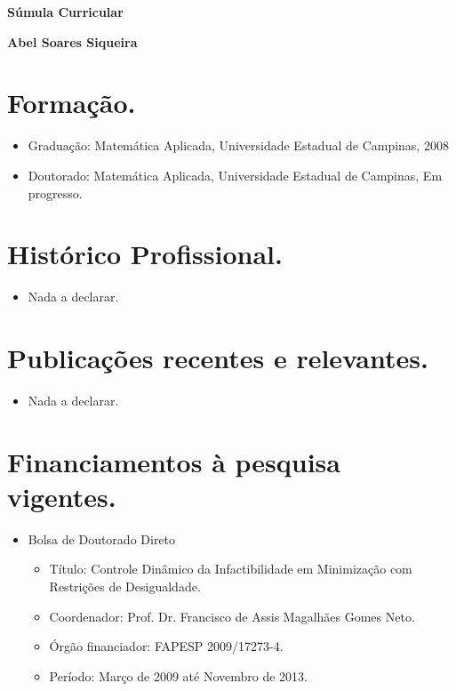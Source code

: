 \documentclass[a4paper,11pt]{article}
\begin{document}
\begin{center}
  \Large \bf Súmula Curricular
\end{center}
\begin{center}
  \bf Abel Soares Siqueira
\end{center}

\section{Formação.}
\begin{itemize}
  \item Graduação: Matemática Aplicada, Universidade Estadual de Campinas, 2008
  \item Doutorado: Matemática Aplicada, Universidade Estadual de Campinas, Em
    progresso.
\end{itemize}

\section{Histórico Profissional.}
\begin{itemize}
  \item Nada a declarar.
\end{itemize}

\section{Publicações recentes e relevantes.}
\begin{itemize}
  \item Nada a declarar.
\end{itemize}

\section{Financiamentos à pesquisa vigentes.}
\begin{itemize}
  \item Bolsa de Doutorado Direto 
  \begin{itemize}
    \item Título: Controle Dinâmico da Infactibilidade em Minimização com
      Restrições de Desigualdade.
    \item Coordenador: Prof. Dr. Francisco de Assis Magalhães Gomes Neto.
    \item Órgão financiador: FAPESP 2009/17273-4.
    \item Período: Março de 2009 até Novembro de 2013.
  \end{itemize}
\end{itemize}
\end{document}
